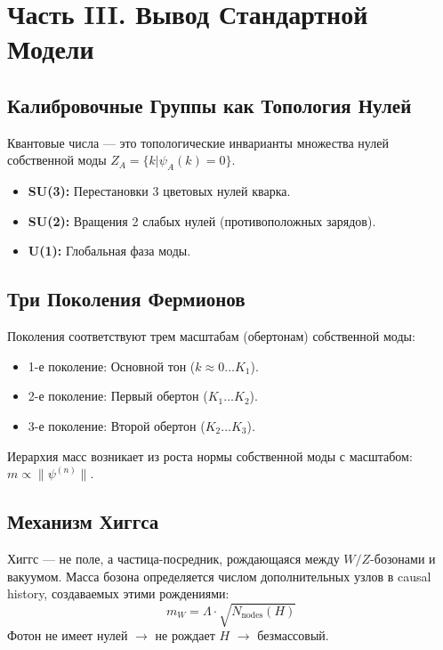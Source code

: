 \documentclass[12pt,a4paper]{article}
\begin{document}
\section{Часть III. Вывод Стандартной Модели}

\subsection{Калибровочные Группы как Топология Нулей}
Квантовые числа — это топологические инварианты множества нулей собственной моды $Z_A = \{k | \psi_A(k)=0\}$.
\begin{itemize}
    \item \textbf{SU(3):} Перестановки 3 цветовых нулей кварка.
    \item \textbf{SU(2):} Вращения 2 слабых нулей (противоположных зарядов).
    \item \textbf{U(1):} Глобальная фаза моды.
\end{itemize}

\subsection{Три Поколения Фермионов}
Поколения соответствуют трем масштабам (обертонам) собственной моды:
\begin{itemize}
    \item 1-е поколение: Основной тон ($k \approx 0 \dots K_1$).
    \item 2-е поколение: Первый обертон ($K_1 \dots K_2$).
    \item 3-е поколение: Второй обертон ($K_2 \dots K_3$).
\end{itemize}
Иерархия масс возникает из роста нормы собственной моды с масштабом: $m \propto \|\psi^{(n)}\|$.

\subsection{Механизм Хиггса}
Хиггс — не поле, а частица-посредник, рождающаяся между $W/Z$-бозонами и вакуумом. Масса бозона определяется числом дополнительных узлов в causal history, создаваемых этими рождениями:
\begin{equation}
    m_W = \Lambda \cdot \sqrt{N_{\text{nodes}}(H)}
\end{equation}
Фотон не имеет нулей $\to$ не рождает $H$ $\to$ безмассовый.

\end{document}

